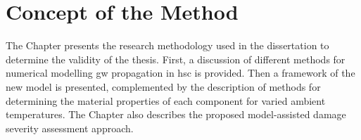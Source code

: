 
\chapter[Concept of the Method]{Concept of the Method}
\label{ch:method}

The Chapter presents the research methodology used in the dissertation to determine the validity of the thesis. 
First, a discussion of different methods for numerical modelling \ac{gw} propagation in \ac{hsc} is provided. 
Then a framework of the new model is presented, complemented by the description of methods for determining the material properties of each component for varied ambient temperatures.
The Chapter also describes the proposed model-assisted damage severity assessment approach.



%

